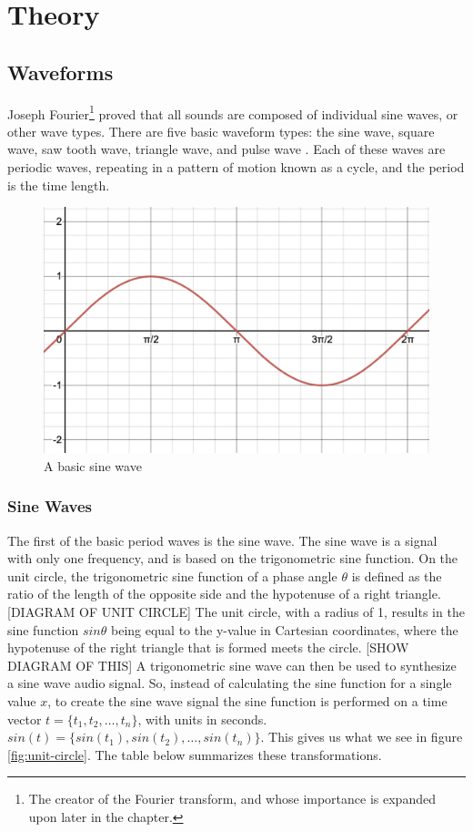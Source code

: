 \chapter[Theory]{Theory}\label{theory}

\section{Waveforms}
Joseph Fourier\footnote{The creator of the Fourier transform, and whose importance is expanded upon later in the chapter.} proved that all sounds are composed of individual sine waves, or other wave types. There are five basic waveform types: the sine wave, square wave, saw tooth wave, triangle wave, and pulse wave \cite{Winer_2018}. Each of these waves are periodic waves, repeating in a pattern of motion known as a cycle, and the period is the time length.

\begin{figure}
	\centering
	\includegraphics[width=\textwidth]{figures/sine-wave-form.png}
	\caption{A basic sine wave}
	\label{fig:basic-sine-wave}
\end{figure}

\subsection{Sine Waves}
The first of the basic period waves is the sine wave. The sine wave is a signal with only one frequency, and is based on the trigonometric sine function. On the unit circle, the trigonometric sine function of a phase angle $\theta$ is defined as the ratio of the length of the opposite side and the hypotenuse of a right triangle. [DIAGRAM OF UNIT CIRCLE] The unit circle, with a radius of 1, results in the sine function $sin\theta$ being equal to the y-value in Cartesian coordinates, where the hypotenuse of the right triangle that is formed meets the circle. [SHOW DIAGRAM OF THIS] A trigonometric sine wave can then be used to synthesize a sine wave audio signal. So, instead of calculating the sine function for a single value $x$, to create the sine wave signal the sine function is performed on a time vector $t = \{t_1, t_2, \dots, t_n\}$, with units in seconds. $sin(t) = \{sin(t_1), sin(t_2), \dots, sin(t_n)\}$. This gives us what we see in figure \ref	{fig:unit-circle}. The table below summarizes these transformations.

